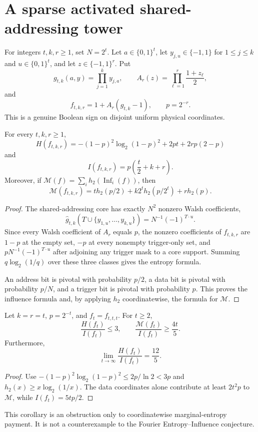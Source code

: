 \section{A sparse activated shared-addressing tower}
\label{sec:sparse-shared-addressing}

For integers $t,k,r\ge1$, set $N=2^t$.  Let $a\in\{0,1\}^t$,
let $y_{j,u}\in\{-1,1\}$ for $1\le j\le k$ and
$u\in\{0,1\}^t$, and let $z\in\{-1,1\}^r$.  Put
\[
 g_{t,k}(a,y)=\prod_{j=1}^k y_{j,a},\qquad
 A_r(z)=\prod_{\ell=1}^r\frac{1+z_\ell}{2},
\]
and
\[
 f_{t,k,r}=1+A_r(g_{t,k}-1),\qquad p=2^{-r}.
\]
This is a genuine Boolean sign on disjoint uniform physical coordinates.

\begin{proposition}
For every $t,k,r\ge1$,
\[
 H(f_{t,k,r})=-(1-p)^2\log_2(1-p)^2+2pt+2rp(2-p)
\]
and
\[
 I(f_{t,k,r})=p\left(\frac t2+k+r\right).
\]
Moreover, if
$\mathcal M(f)=\sum_i h_2(\operatorname{Inf}_i(f))$, then
\[
 \mathcal M(f_{t,k,r})
 =t h_2(p/2)+k2^t h_2(p/2^t)+r h_2(p).
\]
\end{proposition}

\begin{proof}
The shared-addressing core has exactly $N^2$ nonzero Walsh coefficients,
\[
 \widehat g_{t,k}\!\left(T\cup\{y_{1,u},\ldots,y_{k,u}\}\right)
 =N^{-1}(-1)^{T\cdot u}.
\]
Since every Walsh coefficient of $A_r$ equals $p$, the nonzero coefficients
of $f_{t,k,r}$ are $1-p$ at the empty set, $-p$ at every nonempty
trigger-only set, and $pN^{-1}(-1)^{T\cdot u}$ after adjoining any trigger
mask to a core support.  Summing $q\log_2(1/q)$ over these three classes gives
the entropy formula.

An address bit is pivotal with probability $p/2$, a data bit is pivotal with
probability $p/N$, and a trigger bit is pivotal with probability $p$.
This proves the influence formula and, by applying $h_2$ coordinatewise, the
formula for $\mathcal M$.
\end{proof}

\begin{corollary}
Let $k=r=t$, $p=2^{-t}$, and $f_t=f_{t,t,t}$.  For $t\ge2$,
\[
 \frac{H(f_t)}{I(f_t)}\le3,
 \qquad
 \frac{\mathcal M(f_t)}{I(f_t)}\ge\frac{4t}{5}.
\]
Furthermore,
\[
 \lim_{t\to\infty}\frac{H(f_t)}{I(f_t)}=\frac{12}{5}.
\]
\end{corollary}

\begin{proof}
Use $-(1-p)^2\log_2(1-p)^2\le2p/\ln2<3p$ and
$h_2(x)\ge x\log_2(1/x)$.  The data coordinates alone contribute at least
$2t^2p$ to $\mathcal M$, while $I(f_t)=5tp/2$.
\end{proof}

This corollary is an obstruction only to coordinatewise marginal-entropy
payment.  It is not a counterexample to the Fourier Entropy--Influence
conjecture.

